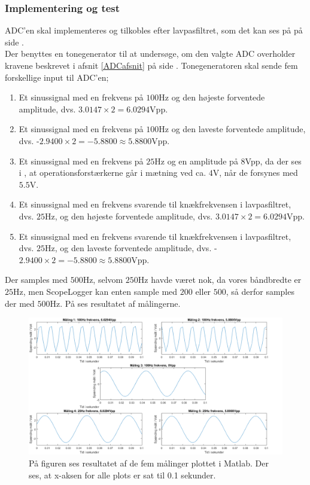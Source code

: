 \subsubsection{Implementering og test}
ADC'en skal implementeres og tilkobles efter lavpasfiltret, som det kan ses på  på side \pageref{kravblok}. \\
Der benyttes en tonegenerator til at undersøge, om den valgte ADC overholder kravene beskrevet i afsnit \ref{ADCafsnit} på side \pageref{ADCafsnit}. Tonegeneratoren skal sende fem forskellige input til ADC'en;
\begin{enumerate}
	\item Et sinussignal med en frekvens på $100$Hz og den højeste forventede amplitude, dvs. $3.0147 \times 2 = 6.0294\text{Vpp}$.
	\item Et sinussignal med en frekvens på $100$Hz og den laveste forventede amplitude, dvs. -$2.9400 \times 2 = -5.8800 \approx 5.8800\text{Vpp}$.
	\item Et sinussignal med en frekvens på $25$Hz og en amplitude på $8$Vpp, da der ses i , at operationsforstærkerne går i mætning ved ca. $4$V, når de forsynes med $5.5$V. 
	\item Et sinussignal med en frekvens svarende til knækfrekvensen i lavpasfiltret, dvs. $25$Hz, og den højeste forventede amplitude, dvs. $3.0147 \times 2 = 6.0294\text{Vpp}$.
	\item Et sinussignal med en frekvens svarende til knækfrekvensen i lavpasfiltret, dvs. $25$Hz, og den laveste forventede amplitude, dvs. -$2.9400 \times 2 = -5.8800 \approx 5.8800\text{Vpp}$.
\end{enumerate}
Der samples med $500$Hz, selvom $250$Hz havde været nok, da vores båndbredte er $25$Hz, men ScopeLogger kan enten sample med $200$ eller $500$, så derfor samples der med $500$Hz. På  ses resultatet af målingerne.

\begin{figure}[H]
	\centering
	\includegraphics[scale=0.45]{figures/cProblemloesning/ADC_Test2_matlab.PNG}
	\caption{På figuren ses resultatet af de fem målinger plottet i Matlab. Der ses, at x-aksen for alle plots er sat til 0.1 sekunder.}
	\label{fig:ADC_Test}
\end{figure}

